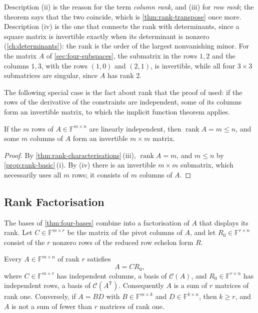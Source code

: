 Description (ii) is the reason for the term \emph{column rank}, and (iii) for \emph{row rank}; the theorem says that the two coincide, which is \cref{thm:rank-transpose} once more. Description (iv) is the one that connects the rank with determinants, since a square matrix is invertible exactly when its determinant is nonzero (\cref{ch:determinants}): the rank is the order of the largest nonvanishing minor. For the matrix $A$ of \cref{sec:four-subspaces}, the submatrix in the rows $1,2$ and the columns $1,3$, with the rows $(1,0)$ and $(2,1)$, is invertible, while all four $3\times3$ submatrices are singular, since $A$ has rank $2$.

The following special case is the fact about rank that the proof of  used: if the rows of the derivative of the constraints are independent, some of its columns form an invertible matrix, to which the implicit function theorem applies.

\begin{corollary}
\label{cor:independent-rows}
If the $m$ rows of $A\in\mathbb F^{m\times n}$ are linearly independent, then $\operatorname{rank}A=m\le n$, and some $m$ columns of $A$ form an invertible $m\times m$ matrix.
\end{corollary}

\begin{proof}
By \cref{thm:rank-characterisations}\,(iii), $\operatorname{rank}A=m$, and $m\le n$ by \cref{prop:rank-basic}\,(i). By (iv) there is an invertible $m\times m$ submatrix, which necessarily uses all $m$ rows; it consists of $m$ columns of $A$.
\end{proof}

\subsection{Rank Factorisation}

The bases of \cref{thm:four-bases} combine into a factorisation of $A$ that displays its rank. Let $C\in\mathbb F^{m\times r}$ be the matrix of the pivot columns of $A$, and let $R_0\in\mathbb F^{r\times n}$ consist of the $r$ nonzero rows of the reduced row echelon form $R$.

\begin{theorem}
\label{thm:rank-factorisation}
Every $A\in\mathbb F^{m\times n}$ of rank $r$ satisfies
\[
A=CR_0,
\]
where $C\in\mathbb F^{m\times r}$ has independent columns, a basis of $\mathcal C(A)$, and $R_0\in\mathbb F^{r\times n}$ has independent rows, a basis of $\mathcal C(A^{\mathsf T})$. Consequently $A$ is a sum of $r$ matrices of rank one. Conversely, if $A=BD$ with $B\in\mathbb F^{m\times k}$ and $D\in\mathbb F^{k\times n}$, then $k\ge r$, and $A$ is not a sum of fewer than $r$ matrices of rank one.
\end{theorem}

